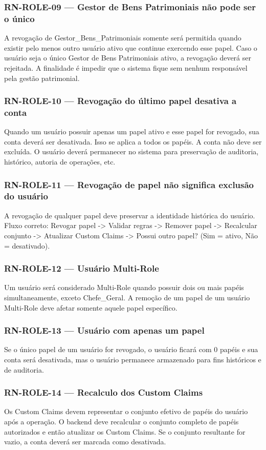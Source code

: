 \subsubsection{RN-ROLE-09 — Gestor de Bens Patrimoniais não pode ser o único}
A revogação de Gestor\_Bens\_Patrimoniais somente será permitida quando existir pelo menos outro usuário ativo que continue exercendo esse papel.
Caso o usuário seja o único Gestor de Bens Patrimoniais ativo, a revogação deverá ser rejeitada.
A finalidade é impedir que o sistema fique sem nenhum responsável pela gestão patrimonial.

\subsubsection{RN-ROLE-10 — Revogação do último papel desativa a conta}
Quando um usuário possuir apenas um papel ativo e esse papel for revogado, sua conta deverá ser desativada.
Isso se aplica a todos os papéis. A conta não deve ser excluída.
O usuário deverá permanecer no sistema para preservação de auditoria, histórico, autoria de operações, etc.

\subsubsection{RN-ROLE-11 — Revogação de papel não significa exclusão do usuário}
A revogação de qualquer papel deve preservar a identidade histórica do usuário.
Fluxo correto: Revogar papel -> Validar regras -> Remover papel -> Recalcular conjunto -> Atualizar Custom Claims -> Possui outro papel? (Sim = ativo, Não = desativado).

\subsubsection{RN-ROLE-12 — Usuário Multi-Role}
Um usuário será considerado Multi-Role quando possuir dois ou mais papéis simultaneamente, exceto Chefe\_Geral.
A remoção de um papel de um usuário Multi-Role deve afetar somente aquele papel específico.

\subsubsection{RN-ROLE-13 — Usuário com apenas um papel}
Se o único papel de um usuário for revogado, o usuário ficará com 0 papéis e sua conta será desativada, mas o usuário permanece armazenado para fins históricos e de auditoria.

\subsubsection{RN-ROLE-14 — Recalculo dos Custom Claims}
Os Custom Claims devem representar o conjunto efetivo de papéis do usuário após a operação. O backend deve recalcular o conjunto completo de papéis autorizados e então atualizar os Custom Claims. Se o conjunto resultante for vazio, a conta deverá ser marcada como desativada.

